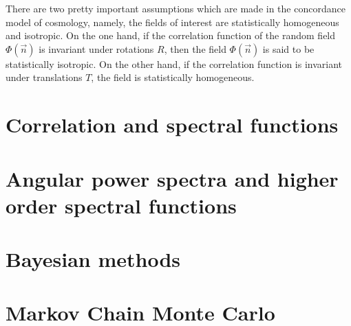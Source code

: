 There are two pretty important assumptions which are made in the concordance model of cosmology, namely, the fields of interest are statistically homogeneous and isotropic. On the one hand, if the correlation function of the random field $\Phi(\vec{n})$ is invariant under rotations $R$, then the field $\Phi(\vec{n})$ is said to be statistically isotropic. On the other hand, if the correlation function is invariant under translations $ T $, the field is statistically homogeneous. 


\section{Correlation and spectral functions}
 
\section{Angular power spectra and higher order spectral functions}

\section{Bayesian methods}

\section{Markov Chain Monte Carlo}